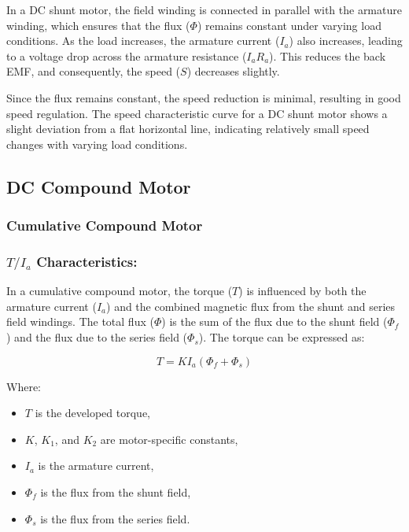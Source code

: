 \documentclass[a4paper,12pt]{article}
\begin{document}
	In a DC shunt motor, the field winding is connected in parallel with the armature winding, which ensures that the flux (\(\Phi\)) remains constant under varying load conditions. As the load increases, the armature current (\(I_a\)) also increases, leading to a voltage drop across the armature resistance (\(I_a R_a\)). This reduces the back EMF, and consequently, the speed (\(S\)) decreases slightly.
	
	Since the flux remains constant, the speed reduction is minimal, resulting in good speed regulation. The speed characteristic curve for a DC shunt motor shows a slight deviation from a flat horizontal line, indicating relatively small speed changes with varying load conditions.
	
	\subsection{DC Compound Motor}
	\subsubsection{Cumulative Compound Motor}
		\subsubsection{$T / I_a$ Characteristics:}
		
		In a cumulative compound motor, the torque (\(T\)) is influenced by both the armature current (\(I_a\)) and the combined magnetic flux from the shunt and series field windings. The total flux (\(\Phi\)) is the sum of the flux due to the shunt field (\(\Phi_f\)) and the flux due to the series field (\(\Phi_s\)). The torque can be expressed as:
		
		\begin{equation}
			T = K I_a (\Phi_f + \Phi_s)
		\end{equation}
		
		
		Where:
		\begin{itemize}
			\item \(T\) is the developed torque,
			\item \(K\), \(K_1\), and \(K_2\) are motor-specific constants,
			\item \(I_a\) is the armature current,
			\item \(\Phi_f\) is the flux from the shunt field,
			\item \(\Phi_s\) is the flux from the series field.
		\end{itemize}
		
\end{document}
